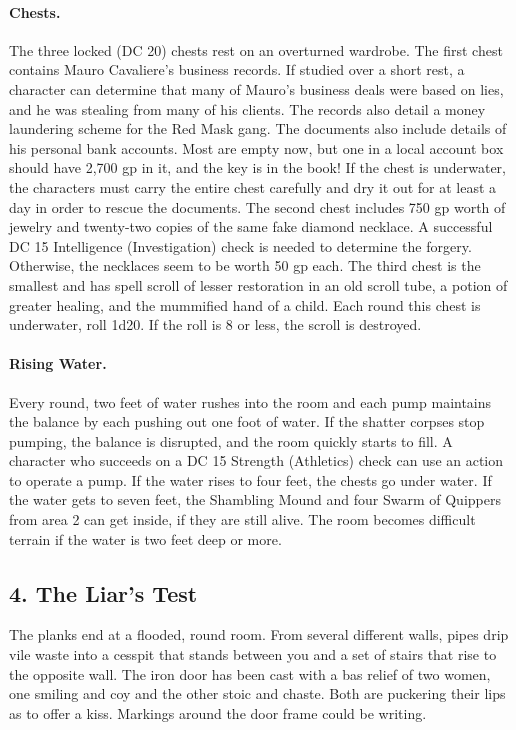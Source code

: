 \documentclass[10pt,a4paper,twoside,twocolumn,openany,bg=print,nodeprecatedcode]{dndbook}
\begin{document}
\paragraph{Chests.}
The three locked (DC 20) chests rest on an overturned wardrobe. The first chest contains Mauro Cavaliere's business records. If studied over a short rest, a character can determine that many of Mauro's business deals were based on lies, and he was stealing from many of his clients. The records also detail a money laundering scheme for the Red Mask gang. The documents also include details of his personal bank accounts. Most are empty now, but one in a local account box should have 2,700 gp in it, and the key is in the book! If the chest is underwater, the characters must carry the entire chest carefully and dry it out for at least a day in order to rescue the documents. The second chest includes 750 gp worth of jewelry and twenty-two copies of the same fake diamond necklace. A successful DC 15 Intelligence (Investigation) check is needed to determine the forgery. Otherwise, the necklaces seem to be worth 50 gp each. The third chest is the smallest and has spell scroll of lesser restoration in an old scroll tube, a potion of greater healing, and the mummified hand of a child. Each round this chest is underwater, roll 1d20. If the roll is 8 or less, the scroll is destroyed.
\paragraph{Rising Water.}
Every round, two feet of water rushes into the room and each pump maintains the balance by each pushing out one foot of water. If the shatter corpses stop pumping, the balance is disrupted, and the room quickly starts to fill. A character who succeeds on a DC 15 Strength (Athletics) check can use an action to operate a pump. If the water rises to four feet, the chests go under water. If the water gets to seven feet, the Shambling Mound and four Swarm of Quippers from area 2 can get inside, if they are still alive. The room becomes difficult terrain if the water is two feet deep or more.
\subsection{4. The Liar's Test}
\begin{DndReadAloud}{}
The planks end at a flooded, round room. From several different walls, pipes drip vile waste into a cesspit that stands between you and a set of stairs that rise to the opposite wall. The iron door has been cast with a bas relief of two women, one smiling and coy and the other stoic and chaste. Both are puckering their lips as to offer a kiss. Markings around the door frame could be writing.
\end{DndReadAloud}
\end{document}
